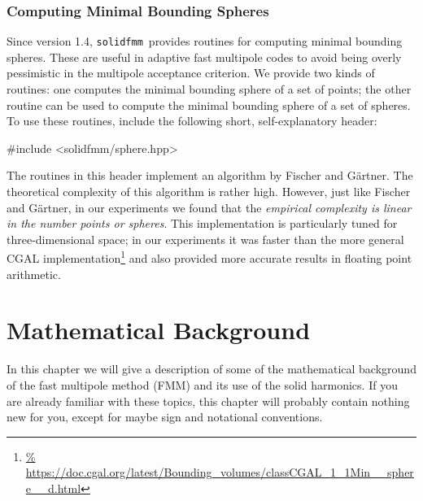 \documentclass{scrbook}
\newcommand{\solidfmm}{\texttt{solidfmm}}
\begin{document}
\subsection{Computing Minimal Bounding Spheres}
Since version 1.4, \solidfmm\ provides routines for computing minimal bounding
spheres. These are useful in adaptive fast multipole codes to avoid being
overly pessimistic in the multipole acceptance criterion. We provide
two kinds of routines: one computes the minimal bounding sphere of a set 
of points; the other routine can be used to compute the minimal bounding sphere
of a set of spheres. To use these routines, include the following
short, self-explanatory header:
\begin{cppcode*}
#include <solidfmm/sphere.hpp>
\end{cppcode*}

The routines in this header implement an algorithm by Fischer and
Gärtner.\autocite{fischer2004} The theoretical complexity of this algorithm is
rather high. However, just like Fischer and Gärtner, in our experiments we
found that the \emph{empirical complexity is linear in the number points or
spheres}. This implementation is particularly tuned for three-dimensional
space; in our experiments it was faster than the more general CGAL
implementation\footnote{\url{%
https://doc.cgal.org/latest/Bounding_volumes/classCGAL_1_1Min__sphere__d.html}}
and also provided more accurate results in floating point arithmetic.


\chapter{Mathematical Background}\label{chp:mathbackground}
In this chapter we will give a description of some of the mathematical
background of the fast multipole method (FMM) and its use of the solid
harmonics. If you are already familiar with these topics, this chapter will
probably contain nothing new for you, except for maybe sign and notational
conventions.
\end{document}
